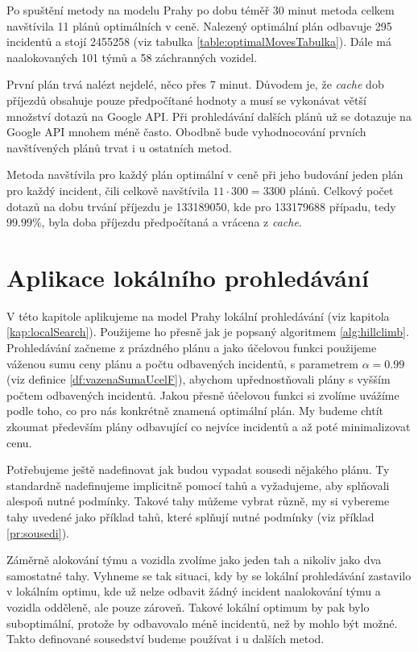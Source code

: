 Po spuštění metody na modelu Prahy po dobu téměř 30 minut metoda celkem navštívila 11 plánů optimálních v ceně.
Nalezený optimální plán odbavuje 295 incidentů a stojí 2455258 (viz tabulka \ref{table:optimalMovesTabulka}).
Dále má naalokovaných 101 týmů a 58 záchranných vozidel.

První plán trvá nalézt nejdelé, něco přes 7 minut. Důvodem je, že \textit{cache} dob příjezdů obsahuje pouze předpočítané hodnoty a musí se vykonávat větší množství
dotazů na Google API.
Při prohledávání dalších plánů už se dotazuje na Google API mnohem méně často.
Obodbně bude vyhodnocování prvních navštívených plánů trvat i u ostatních metod.

Metoda navštívila pro každý plán optimální v ceně při jeho budování jeden plán pro každý incident, čili celkově navštívila $11 \cdot 300 = 3300$ plánů.
Celkový počet dotazů na dobu trvání příjezdu je 133189050, kde pro 133179688 případu, tedy $99.99\%$, byla doba příjezdu předpočítaná a vrácena z \textit{cache}.

\section{Aplikace lokálního prohledávání}

V této kapitole aplikujeme na model Prahy lokální prohledávání (viz kapitola \ref{kap:localSearch}).
Použijeme ho přesně jak je popsaný algoritmem \ref{alg:hillclimb}.
Prohledávání začneme z prázdného plánu a jako účelovou funkci použijeme váženou sumu ceny plánu a počtu odbavených incidentů, s parametrem $\alpha = 0.99$ (viz definice \ref{df:vazenaSumaUcelF}),
abychom upřednostňovali plány s vyšším počtem odbavených incidentů.
Jakou přesně účelovou funkci si zvolíme uvážíme podle toho, co pro nás konkrétně znamená optimální plán. My budeme chtít zkoumat především plány odbavující co nejvíce incidentů a až poté minimalizovat cenu.

Potřebujeme ještě nadefinovat jak budou vypadat sousedi nějakého plánu.
Ty standardně nadefinujeme implicitně pomocí tahů a vyžadujeme, aby splňovali alespoň nutné podmínky.
Takové tahy můžeme vybrat různě, my si vybereme tahy uvedené jako příklad tahů, které splňují nutné podmínky (viz příklad \ref{pr:sousedi}).

Záměrně alokování týmu a vozidla zvolíme jako jeden tah a nikoliv jako dva samostatné tahy. Vyhneme se tak situaci, kdy by se lokální prohledávání zastavilo v lokálním optimu, 
kde už nelze odbavit žádný incident naalokování týmu a vozidla odděleně, ale pouze zároveň. Takové lokální optimum by pak bylo suboptimální, protože by odbavovalo méně incidentů, než by mohlo být možné.
Takto definované sousedství budeme používat i u dalších metod.

